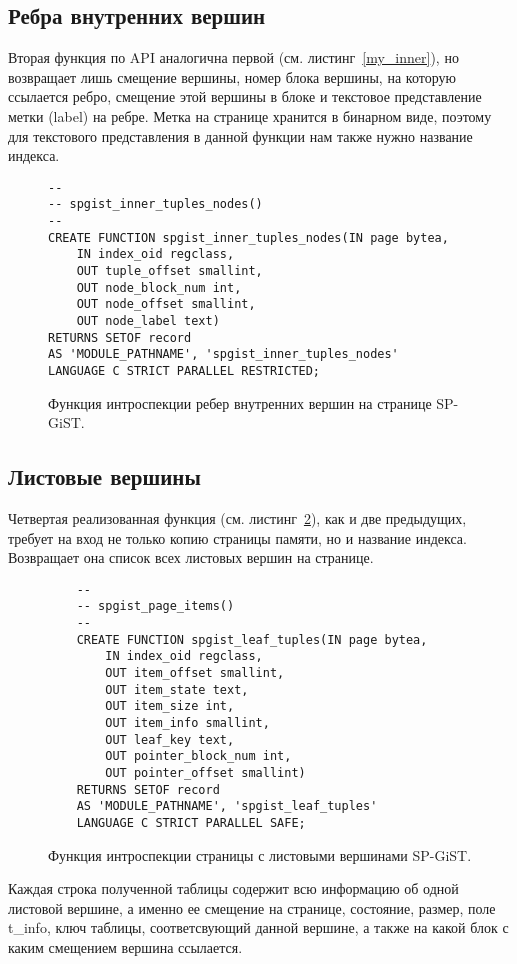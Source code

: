 \documentclass[12pt,oneside]{amsart}
\begin{document}
\subsection{Ребра внутренних вершин}

Вторая функция по API аналогична первой (см. листинг~\ref{my_inner}), но возвращает лишь смещение вершины, номер блока вершины, на которую ссылается ребро, смещение этой вершины в блоке и текстовое представление метки (label) на ребре. Метка на странице хранится в бинарном виде, поэтому для текстового представления в данной функции нам также нужно название индекса.

\begin{figure}[ht]
\begin{lstlisting}
--
-- spgist_inner_tuples_nodes()
--
CREATE FUNCTION spgist_inner_tuples_nodes(IN page bytea,
    IN index_oid regclass,
    OUT tuple_offset smallint,
    OUT node_block_num int,
    OUT node_offset smallint,
    OUT node_label text)
RETURNS SETOF record
AS 'MODULE_PATHNAME', 'spgist_inner_tuples_nodes'
LANGUAGE C STRICT PARALLEL RESTRICTED;
\end{lstlisting}
\caption{Функция интроспекции ребер внутренних вершин на странице SP-GiST.}\label{my_edges}
\end{figure}

\subsection{Листовые вершины}

Четвертая реализованная функция (см. листинг~\ref{my_leaf}), как и две предыдущих, требует на вход не только копию страницы памяти, но и название индекса. Возвращает она список всех листовых вершин на странице.

\begin{figure}[ht]
\begin{lstlisting}
	--
	-- spgist_page_items()
	--
	CREATE FUNCTION spgist_leaf_tuples(IN page bytea,
		IN index_oid regclass,
		OUT item_offset smallint,
		OUT item_state text,
		OUT item_size int,
		OUT item_info smallint,
		OUT leaf_key text,
		OUT pointer_block_num int,
		OUT pointer_offset smallint)
	RETURNS SETOF record
	AS 'MODULE_PATHNAME', 'spgist_leaf_tuples'
	LANGUAGE C STRICT PARALLEL SAFE;
\end{lstlisting}
\caption{Функция интроспекции страницы с листовыми вершинами SP-GiST.}\label{my_leaf}
\end{figure}

Каждая строка полученной таблицы содержит всю информацию об одной листовой вершине, а именно ее смещение на странице, состояние, размер, поле t\_info, ключ таблицы, соответсвующий данной вершине, а также на какой блок с каким смещением вершина ссылается.
\end{document}
